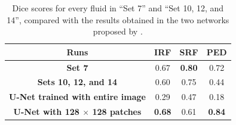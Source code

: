 \begin{table}[!ht]
	\caption{Dice scores for every fluid in ``Set 7'' and ``Set 10, 12, and 14'', compared with the results obtained in the two networks proposed by \textcite{Alsaih2020}.}
	\centering
	\begin{tabular}{|c|c|c|c|}
			\hline
			\textbf{Runs} & \textbf{IRF} & 
			\textbf{SRF} & 
			\textbf{PED} \\
						
			\hline
			
			\textbf{Set 7} & 0.67 & \textbf{0.80} & 0.72 \\
			
			\hline
			
			\textbf{Sets 10, 12, and 14} & 0.60 & 0.75 & 0.44 \\
			
			\hline
			\hline
			
			\textbf{U-Net trained with entire image \parencite{Alsaih2020}} & 0.29 & 0.47 & 0.18 \\
			
			\hline
			
			\textbf{U-Net with 128 $\times$ 128 patches \parencite{Alsaih2020}} & \textbf{0.68} & 0.61 & \textbf{0.84} \\
			
			\hline
			
	\end{tabular}
	\label{tab:Experiment1VsExperiment2VsLiterature}
\end{table}

